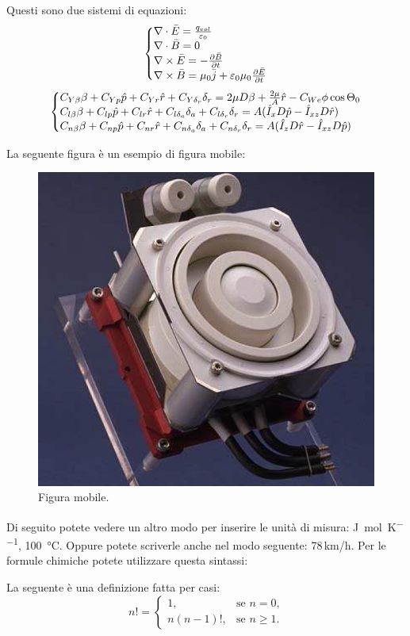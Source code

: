 \documentclass[12pt,twoside,cucitura]{toptesi}
\makeatletter
\newenvironment{sistema}%
{\left\lbrace\begin{array}{@{}l@{}}}%
{\end{array}\right.}
\makeatother
\begin{document}
Questi sono due sistemi di equazioni:
\[
\begin{sistema}
\nabla\cdot\bar{E}=\frac{q_{vol}}{\varepsilon_0}\\
\nabla\cdot\bar{B}=0\\
\nabla\times\bar{E}=-\frac{\partial \bar{B}}{\partial t}\\
\nabla\times\bar{B}=\mu_0\bar{j}+\varepsilon_0\mu_0\frac{\partial\bar{E}}{\partial t}
\end{sistema}
\]
\[
\begin{sistema}
C_{Y\beta}\beta+C_{Yp}\hat{p}+C_{Yr}\hat{r}+C_{Y\delta_r}\delta_r=2\mu D\beta+\frac{2\mu}{A}\hat{r}-C_{We}\phi\cos\Theta_0\\
C_{l\beta}\beta+C_{lp}\hat{p}+C_{lr}\hat{r}+C_{l\delta_a}\delta_a+C_{l\delta_r}\delta_r=A(\hat{I}_xD\hat{p}-\hat{I}_{xz}D\hat{r})\\
C_{n\beta}\beta+C_{np}\hat{p}+C_{nr}\hat{r}+C_{n\delta_{a}}\delta_a+C_{n\delta_r}\delta_r=A(\hat{I}_zD\hat{r}-\hat{I}_{xz}D\hat{p})
\end{sistema}
\]

La seguente figura è un esempio di figura mobile:
\begin{figure}[]
\centering
\includegraphics[width=.5\textwidth]{esempio} 
\caption{Figura mobile.\label{fig25}}
\end{figure}

Di seguito potete vedere un altro modo per inserire le unità di misura: \si{\joule\per\mole\per\kelvin}, \SI{100}{\celsius}. Oppure potete scriverle anche nel modo seguente: 78\,km/h. Per le formule chimiche potete utilizzare questa sintassi:

La seguente è una definizione fatta per casi:
\[
n!=
\begin{cases}
1, & \text{se $n=0$,} \\
n(n-1)!, & \text{se $n\ge 1$.}
\end{cases}
\]
\end{document}
